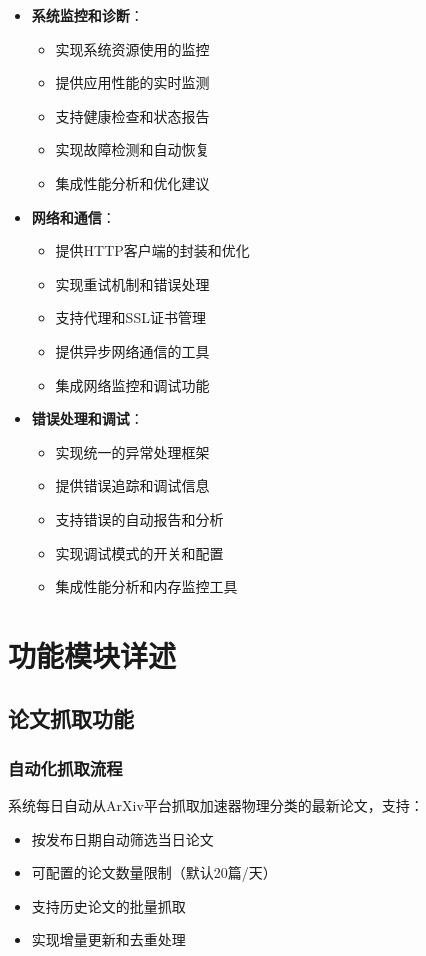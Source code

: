 \documentclass[12pt,a4paper]{article}
\begin{document}
\begin{itemize}
    \item \textbf{系统监控和诊断}：
        \begin{itemize}
            \item 实现系统资源使用的监控
            \item 提供应用性能的实时监测
            \item 支持健康检查和状态报告
            \item 实现故障检测和自动恢复
            \item 集成性能分析和优化建议
        \end{itemize}
    
    \item \textbf{网络和通信}：
        \begin{itemize}
            \item 提供HTTP客户端的封装和优化
            \item 实现重试机制和错误处理
            \item 支持代理和SSL证书管理
            \item 提供异步网络通信的工具
            \item 集成网络监控和调试功能
        \end{itemize}
    
    \item \textbf{错误处理和调试}：
        \begin{itemize}
            \item 实现统一的异常处理框架
            \item 提供错误追踪和调试信息
            \item 支持错误的自动报告和分析
            \item 实现调试模式的开关和配置
            \item 集成性能分析和内存监控工具
        \end{itemize}
\end{itemize}

\section{功能模块详述}

\subsection{论文抓取功能}

\subsubsection{自动化抓取流程}
系统每日自动从ArXiv平台抓取加速器物理分类的最新论文，支持：
\begin{itemize}
    \item 按发布日期自动筛选当日论文
    \item 可配置的论文数量限制（默认20篇/天）
    \item 支持历史论文的批量抓取
    \item 实现增量更新和去重处理
\end{itemize}
\end{document}
